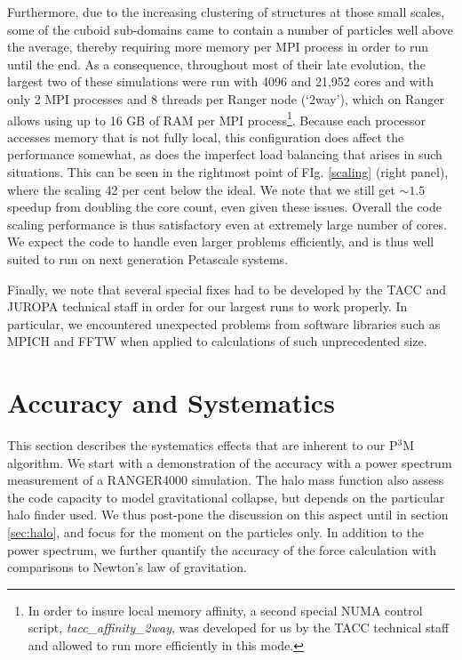 \documentclass[useAMS,usenatbib]{mn2e}
\begin{document}
Furthermore, due to the increasing clustering of structures at those small 
scales, some of the cuboid sub-domains came to contain a number of particles
well above the 
average, thereby requiring more memory per {\small MPI} process
in order to run until the end. 
As a consequence,  throughout most of their late evolution, the 
largest two of these simulations were run with 4096 and 21,952 cores and 
with only 2 {\small MPI} processes and 8 threads per Ranger node (`2way'), which on 
Ranger allows using up to 16 GB of RAM per {\small MPI} process\footnote{In order to insure 
local memory affinity,  a second special NUMA control script, {\it tacc\_affinity\_2way}, 
was developed for us by the TACC technical staff and allowed to run more efficiently 
in this mode.}. Because each processor accesses memory that is not fully local, this configuration does affect the 
performance somewhat, as does the imperfect load balancing that arises in such situations.
This can be seen in the rightmost point of FIg. \ref{scaling} (right panel), where the scaling 42 per cent below the ideal.
We note that we still get $\sim1.5$ speedup
from doubling the core count, even given these issues. Overall the
code scaling performance is thus satisfactory even at extremely large number of cores.
 We expect the code to handle even larger problems efficiently, and is thus well suited to run on
  next generation Petascale systems. 

Finally, we note that several special fixes had to be developed by  the TACC 
and JUROPA technical staff in order for our largest runs to work properly.
In particular, we encountered unexpected problems from software libraries such as 
{\small MPICH} and {\small FFTW} when applied to calculations of such 
unprecedented size. 

%

\section{Accuracy and Systematics}
\label{sec:accuracy}
 
 This section describes the systematics effects that are inherent to our P$^{3}$M algorithm.
 We start with a demonstration of the accuracy with a power spectrum measurement of a RANGER4000 simulation. 
 The halo mass function also assess the code capacity to model gravitational collapse, 
 but depends on the particular halo finder used.
 We thus post-pone the discussion on this aspect until in section \ref{sec:halo},
and focus for the moment on the particles only. In addition to the power spectrum, we further quantify the accuracy of the force calculation
 with comparisons to Newton's law of gravitation.
 
\end{document}

